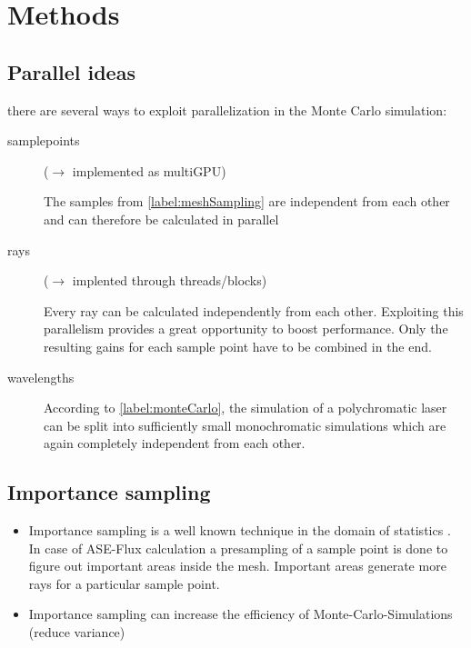 \section{Methods}
\subsection{Parallel ideas}

there are several ways to exploit parallelization in the Monte Carlo simulation:

\begin{description}

  \item[samplepoints] ($\rightarrow$ implemented as multiGPU)

    The samples from \ref{label:meshSampling} are independent from each other
    and can therefore be calculated in parallel

  \item[rays] ($\rightarrow$ implented through threads/blocks)
    
    Every ray can be calculated independently from each other.
    Exploiting this parallelism provides a great opportunity to boost
    performance. Only the resulting gains for each sample point have to be
    combined in the end.

  \item[wavelengths]

    According to \ref{label:monteCarlo}, the simulation of a polychromatic
    laser can be split into sufficiently small monochromatic simulations which
    are again completely independent from each other.

\end{description}


\subsection{Importance sampling}
\begin{itemize}
\item Importance sampling is a well known technique in the domain
  of statistics \cite{importanceSamplingSource}. In case of ASE-Flux calculation a presampling of
  a sample point is done to figure out important areas
  inside the mesh. Important areas generate more rays for a
  particular sample point.
\item Importance sampling can increase the efficiency of Monte-Carlo-Simulations (reduce variance)
\end{itemize}

